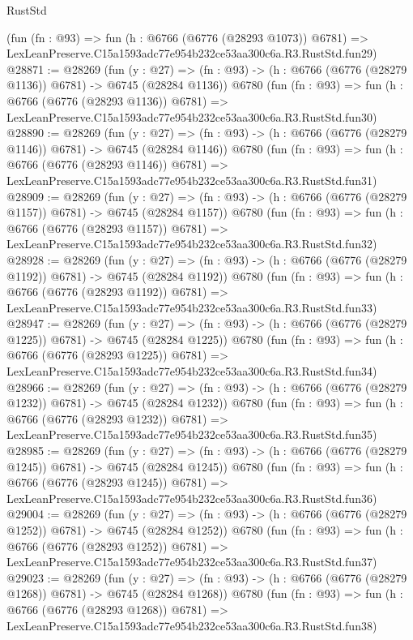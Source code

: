 \begin{lexlean}{RustStd}
\begin{coremodule}
    (fun (fn : @93) =>
    fun (h : @6766 (@6776 (@28293 @1073)) @6781) =>
    LexLeanPreserve.C15a1593adc77e954b232ce53aa300c6a.R3.RustStd.fun29)
@28871 := @28269
    (fun (y : @27) =>
    (fn : @93) -> (h : @6766 (@6776 (@28279 @1136)) @6781) -> @6745 (@28284 @1136))
    @6780
    (fun (fn : @93) =>
    fun (h : @6766 (@6776 (@28293 @1136)) @6781) =>
    LexLeanPreserve.C15a1593adc77e954b232ce53aa300c6a.R3.RustStd.fun30)
@28890 := @28269
    (fun (y : @27) =>
    (fn : @93) -> (h : @6766 (@6776 (@28279 @1146)) @6781) -> @6745 (@28284 @1146))
    @6780
    (fun (fn : @93) =>
    fun (h : @6766 (@6776 (@28293 @1146)) @6781) =>
    LexLeanPreserve.C15a1593adc77e954b232ce53aa300c6a.R3.RustStd.fun31)
@28909 := @28269
    (fun (y : @27) =>
    (fn : @93) -> (h : @6766 (@6776 (@28279 @1157)) @6781) -> @6745 (@28284 @1157))
    @6780
    (fun (fn : @93) =>
    fun (h : @6766 (@6776 (@28293 @1157)) @6781) =>
    LexLeanPreserve.C15a1593adc77e954b232ce53aa300c6a.R3.RustStd.fun32)
@28928 := @28269
    (fun (y : @27) =>
    (fn : @93) -> (h : @6766 (@6776 (@28279 @1192)) @6781) -> @6745 (@28284 @1192))
    @6780
    (fun (fn : @93) =>
    fun (h : @6766 (@6776 (@28293 @1192)) @6781) =>
    LexLeanPreserve.C15a1593adc77e954b232ce53aa300c6a.R3.RustStd.fun33)
@28947 := @28269
    (fun (y : @27) =>
    (fn : @93) -> (h : @6766 (@6776 (@28279 @1225)) @6781) -> @6745 (@28284 @1225))
    @6780
    (fun (fn : @93) =>
    fun (h : @6766 (@6776 (@28293 @1225)) @6781) =>
    LexLeanPreserve.C15a1593adc77e954b232ce53aa300c6a.R3.RustStd.fun34)
@28966 := @28269
    (fun (y : @27) =>
    (fn : @93) -> (h : @6766 (@6776 (@28279 @1232)) @6781) -> @6745 (@28284 @1232))
    @6780
    (fun (fn : @93) =>
    fun (h : @6766 (@6776 (@28293 @1232)) @6781) =>
    LexLeanPreserve.C15a1593adc77e954b232ce53aa300c6a.R3.RustStd.fun35)
@28985 := @28269
    (fun (y : @27) =>
    (fn : @93) -> (h : @6766 (@6776 (@28279 @1245)) @6781) -> @6745 (@28284 @1245))
    @6780
    (fun (fn : @93) =>
    fun (h : @6766 (@6776 (@28293 @1245)) @6781) =>
    LexLeanPreserve.C15a1593adc77e954b232ce53aa300c6a.R3.RustStd.fun36)
@29004 := @28269
    (fun (y : @27) =>
    (fn : @93) -> (h : @6766 (@6776 (@28279 @1252)) @6781) -> @6745 (@28284 @1252))
    @6780
    (fun (fn : @93) =>
    fun (h : @6766 (@6776 (@28293 @1252)) @6781) =>
    LexLeanPreserve.C15a1593adc77e954b232ce53aa300c6a.R3.RustStd.fun37)
@29023 := @28269
    (fun (y : @27) =>
    (fn : @93) -> (h : @6766 (@6776 (@28279 @1268)) @6781) -> @6745 (@28284 @1268))
    @6780
    (fun (fn : @93) =>
    fun (h : @6766 (@6776 (@28293 @1268)) @6781) =>
    LexLeanPreserve.C15a1593adc77e954b232ce53aa300c6a.R3.RustStd.fun38)

\end{coremodule}
\end{lexlean}
